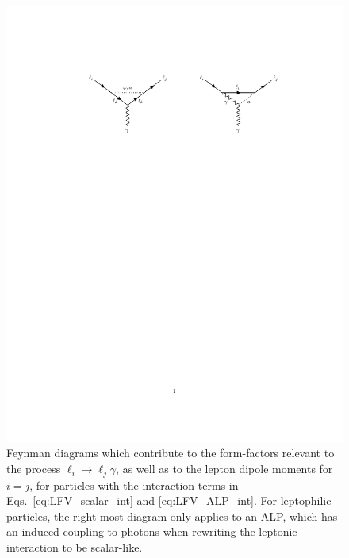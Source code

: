 \begin{figure}[t!]
    \centering
    \includegraphics[width=0.9\linewidth]{figures/chapter3/photon_diagram.pdf}
    \caption[Feynman diagrams which contribute to the diagonal and off-diagonal lepton dipole form-factors.]{Feynman diagrams which contribute to the form-factors relevant to the process $\ell_i\rightarrow\ell_j\gamma$, as well as to the lepton dipole moments for $i = j$, for particles with the interaction terms in Eqs.~\ref{eq:LFV_scalar_int} and \ref{eq:LFV_ALP_int}. For leptophilic particles, the right-most diagram only applies to an ALP, which has an induced coupling to photons when rewriting the leptonic interaction to be scalar-like.}
    \label{fig:LFV_vertex}
\end{figure}


